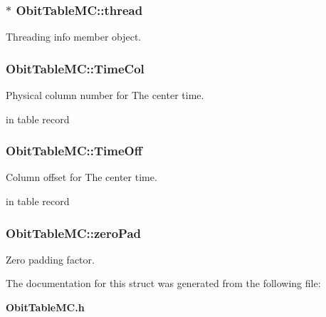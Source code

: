 \subsubsection{$\ast$ {\bf Obit\-Table\-MC::thread}}\label{structObitTableMC_o4}


Threading info member object. 

\subsubsection{ {\bf Obit\-Table\-MC::Time\-Col}}\label{structObitTableMC_o31}


Physical column number for The center time. 

in table record 
\subsubsection{ {\bf Obit\-Table\-MC::Time\-Off}}\label{structObitTableMC_o30}


Column offset for The center time. 

in table record 
\subsubsection{ {\bf Obit\-Table\-MC::zero\-Pad}}\label{structObitTableMC_o27}


Zero padding factor. 



The documentation for this struct was generated from the following file:\begin{CompactItemize}
\item 
{\bf Obit\-Table\-MC.h}\end{CompactItemize}

